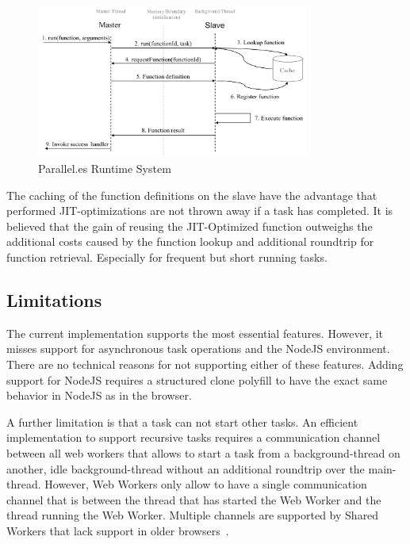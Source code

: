 \begin{figure}
	\centering
	\includegraphics[width=0.8\textwidth]{runtime-system.pdf}

	\caption{Parallel.es Runtime System}
	\label{fig:runtime-system}
\end{figure}

The caching of the function definitions on the slave have the advantage that performed JIT-optimizations are not thrown away if a task has completed. It is believed that the gain of reusing the JIT-Optimized function outweighs the additional costs caused by the function lookup and additional roundtrip for function retrieval. Especially for frequent but short running tasks. 


\subsection{Limitations}
The current implementation supports the most essential features. However, it misses support for asynchronous task operations and the NodeJS environment. There are no technical reasons for not supporting either of these features. Adding support for NodeJS requires a structured clone polyfill to have the exact same behavior in NodeJS as in the browser.

A further limitation is that a task can not start other tasks. An efficient implementation to support recursive tasks requires a communication channel between all web workers that allows to start a task from a background-thread on another, idle background-thread without an additional roundtrip over the main-thread. However, Web Workers only allow to have a single communication channel that is between the thread that has started the Web Worker and the thread running the Web Worker. Multiple channels are supported by Shared Workers that lack support in older browsers~\cite[section 4.6.4]{w3cWebWorker}.